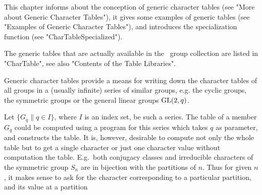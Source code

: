 %

This  chapter informs about  the conception  of generic  character tables
(see "More about Generic  Character  Tables"), it gives some examples  of
generic  tables  (see  "Examples   of  Generic  Character  Tables"),  and
introduces the specialization function (see "CharTableSpecialized").

The  generic  tables  that  are actually  available  in the  \GAP\  group
collection  are listed in "CharTable", see  also "Contents  of  the Table
Libraries".


Generic character tables provide a means  for writing  down the character
tables of  all  groups in  a (usually infinite) series of similar groups,
e.g. the cyclic groups, the symmetric groups or the general linear groups
${\rm GL}(2,q)$.

Let $\{G_q\|q\in I\}$, where $I$ is an index set, be such  a series.  The
table of a member $G_q$ could be computed using a program for this series
which takes  $q$ as parameter, and constructs the table.  It is, however,
desirable  to compute  not  only  the  whole  table  but  to get a single
character  or  just one character  value without  computation  the table.
E.g.\ both conjugacy classes and irreducible characters of  the symmetric
group $S_n$ are in bijection with the partitions of $n$.   Thus for given
$n$,  it  makes  sense  to  ask  for the  character  corresponding  to  a
particular partition, and its value at a partition\:

